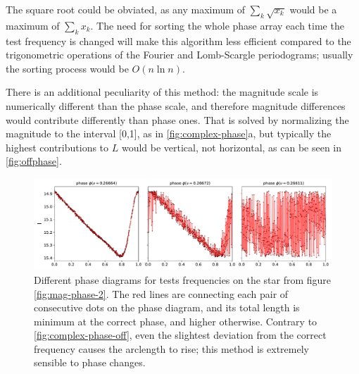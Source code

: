 	The square root could be obviated, as any maximum of $\sum_k \sqrt{x_k}$ would be a maximum of $\sum_k x_k$.
	The need for sorting the whole phase array each time the test frequency is changed will make this algorithm less efficient
	compared to the trigonometric operations of the Fourier and Lomb-Scargle periodograms;
	usually the sorting process would be $O(n\ln n)$.
	
	There is an additional peculiarity of this method: the magnitude scale is numerically different than the phase scale, 
	and therefore magnitude differences would contribute differently than phase ones.
	That is solved by normalizing the magnitude to the interval [0,1], as in \autoref{fig:complex-phase}a,
	but typically the highest contributions to $L$ would be vertical, not horizontal, as can be seen in \autoref{fig:offphase}.
	
	\begin{figure}
		\centering
		\includegraphics[width=\textwidth]{img/offphase.pdf}
		\caption[Off-frequency phase diagrams: arclength]{
			Different phase diagrams for tests frequencies on the star from figure \ref{fig:mag-phase-2}.
			The red lines are connecting each pair of consecutive dots on the phase diagram,
			and its total length is minimum at the correct phase, and higher otherwise.
			Contrary to \autoref{fig:complex-phase-off}, even the slightest deviation from the correct frequency causes the arclength to rise;
			this method is extremely sensible to phase changes.
		}
		\label{fig:offphase}
	\end{figure}
	
